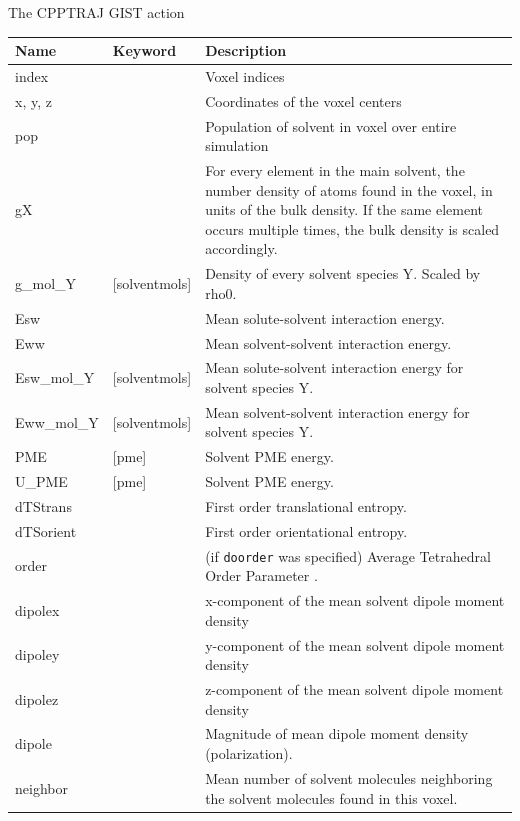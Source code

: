 \documentclass[9pt,tutorial]{livecoms}
\newcommand\inlinecode{\texttt}
\begin{document}
\begin{Checklists*}[h!]
\begin{checklist}{The CPPTRAJ GIST action}
\begin{tabularx}{\textwidth}{@{}l l X@{}}
\toprule
Name & Keyword & Description\\
\midrule
index & & Voxel indices \\
x, y, z & & Coordinates of the voxel centers \\
pop & & Population of solvent in voxel over entire simulation \\
gX &  & For every element in the main solvent, the number density of atoms found in the voxel, in units of the bulk density. If the same element occurs multiple times, the bulk density is scaled accordingly. \\
g\_mol\_Y & [solventmols]  & Density of every solvent species Y. Scaled by rho0. \\
Esw &  &  Mean solute-solvent interaction energy. \\
Eww &  & Mean solvent-solvent interaction energy. \\
Esw\_mol\_Y & [solventmols]  &  Mean solute-solvent interaction energy for solvent species Y. \\
Eww\_mol\_Y & [solventmols]  & Mean solvent-solvent interaction energy for solvent species Y. \\
PME & [pme] & Solvent PME energy. \\
U\_PME & [pme] & Solvent PME energy. \\
dTStrans &  & First order translational entropy. \\
dTSorient &  & First order orientational entropy. \\
order &  & (if \inlinecode{doorder} was specified) Average Tetrahedral Order Parameter \cite{chatterjee2008computational}. \\
dipolex &  & x-component of the mean solvent dipole moment density \\
dipoley &  & y-component of the mean solvent dipole moment density \\
dipolez &  & z-component of the mean solvent dipole moment density \\
dipole &  & Magnitude of mean dipole moment density (polarization). \\
neighbor &  & Mean number of solvent molecules neighboring the solvent molecules found in this voxel. \\

\end{tabularx}
\end{checklist}
\end{Checklists*}
\end{document}
